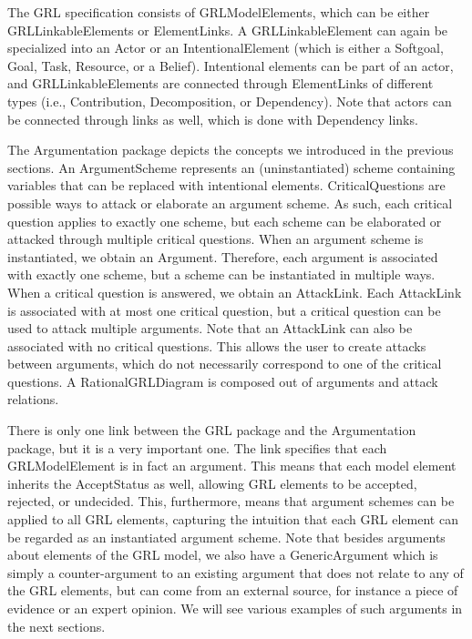 The GRL specification consists of \textsf{GRLModelElements}, which can be either \textsf{GRLLinkableElements} or \textsf{ElementLinks}. A \textsf{GRLLinkableElement} can again be specialized into an \textsf{Actor} or an \textsf{IntentionalElement} (which is either a \textsf{Softgoal}, \textsf{Goal}, \textsf{Task}, \textsf{Resource}, or a \textsf{Belief}). Intentional elements can be part of an actor, and \textsf{GRLLinkableElements} are connected through \textsf{ElementLinks} of different types (i.e., \textsf{Contribution, Decomposition}, or \textsf{Dependency}). Note that actors can be connected through links as well, which is done with \textsf{Dependency} links. 

The Argumentation package depicts the concepts we introduced in the previous sections. An \textsf{ArgumentScheme} represents an (uninstantiated) scheme containing variables that can be replaced with intentional elements. \textsf{CriticalQuestions} are possible ways to attack or elaborate an argument scheme. As such, each critical question applies to exactly one scheme, but each scheme can be elaborated or attacked through multiple critical questions. When an argument scheme is instantiated, we obtain an \textsf{Argument}. Therefore, each argument is associated with exactly one scheme, but a scheme can be instantiated in multiple ways. When a critical question is answered, we obtain an \textsf{AttackLink}. Each \textsf{AttackLink} is associated with at most one critical question, but a critical question can be used to attack multiple arguments.  Note that an \textsf{AttackLink} can also be associated with no critical questions. This allows the user to create attacks between arguments, which do not necessarily correspond to one of the critical questions. A \textsf{RationalGRLDiagram} is composed out of arguments and attack relations.

There is only one link between the \textsf{GRL} package and the \textsf{Argumentation} package, but it is a very important one. The link specifies that each \textsf{GRLModelElement} is in fact an argument. This means that each model element inherits the \textsf{AcceptStatus} as well, allowing GRL elements to be accepted, rejected, or undecided. This, furthermore, means that argument schemes can be applied to all GRL elements, capturing the intuition that each GRL element can be regarded as an instantiated argument scheme. Note that besides arguments about elements of the GRL model, we also have a \textsf{GenericArgument} which is simply a counter-argument to an existing argument that does not relate to any of the GRL elements, but can come from an external source, for instance a piece of evidence or an expert opinion. We will see various examples of such arguments in the next sections.

